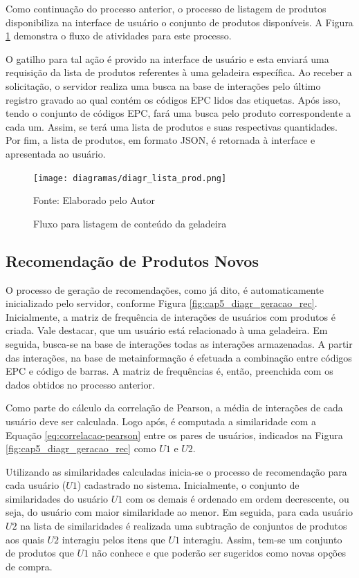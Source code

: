 Como  continuação do processo anterior, o processo de listagem de produtos disponibiliza na interface de usuário o conjunto de produtos disponíveis. A Figura \ref{fig:cap5_diagr_lista_prod} demonstra o fluxo de atividades para este processo.

O gatilho para tal ação é provido na interface de usuário e esta enviará uma requisição da lista de produtos referentes à uma geladeira específica. Ao receber a solicitação, o servidor realiza uma busca na base de interações pelo último registro gravado ao qual contém os códigos EPC lidos das etiquetas. Após isso, tendo o conjunto de códigos EPC, fará uma busca pelo produto correspondente a cada um. Assim, se terá uma lista de produtos e suas respectivas quantidades. Por fim, a lista de produtos, em formato JSON, é retornada à interface e apresentada ao usuário.

\begin{figure}[htb]
    \caption{Fluxo para listagem de conteúdo da geladeira}
    \label{fig:cap5_diagr_lista_prod}
    \texttt{[image: diagramas/diagr\_lista\_prod.png]}
    
    \footnotesize{Fonte: Elaborado pelo Autor}
\end{figure}

\subsection{Recomendação de Produtos Novos} \label{ssec:geracao_rec_novo}

O processo de geração de recomendações, como já dito, é automaticamente inicializado pelo servidor, conforme Figura \ref{fig:cap5_diagr_geracao_rec}. Inicialmente, a matriz de frequência de interações de usuários com produtos é criada. Vale destacar, que um usuário está relacionado à uma geladeira. Em seguida, busca-se na base de interações todas as interações armazenadas. A partir das interações, na base de metainformação é efetuada a combinação entre códigos EPC e código de barras. A matriz de frequências é, então, preenchida com os dados obtidos no processo anterior.

Como parte do cálculo da correlação de Pearson, a média de interações de cada usuário deve ser calculada. Logo após, é computada a similaridade com a Equação \ref{eq:correlacao-pearson} entre os pares de usuários, indicados na Figura \ref{fig:cap5_diagr_geracao_rec} como $U1$ e $U2$.

Utilizando as similaridades calculadas inicia-se o processo de recomendação para cada usuário ($U1$) cadastrado no sistema. Inicialmente, o conjunto de similaridades do usuário $U1$ com os demais é ordenado em ordem decrescente, ou seja, do usuário com maior similaridade ao menor. Em seguida, para cada usuário $U2$ na lista de similaridades é realizada uma subtração de conjuntos de produtos aos quais $U2$ interagiu pelos itens que $U1$ interagiu. Assim, tem-se um conjunto de produtos que $U1$ não conhece e que poderão ser sugeridos como novas opções de compra. 

